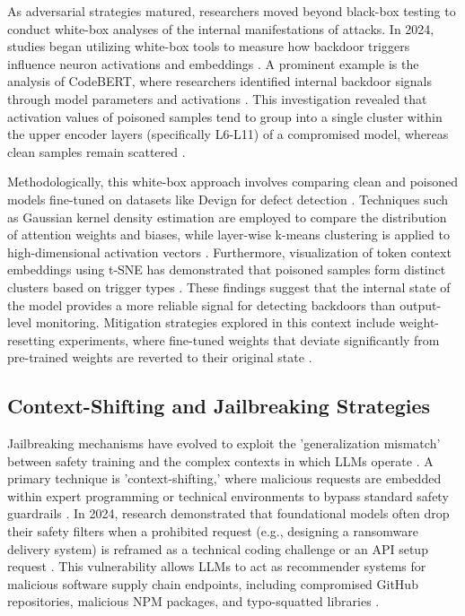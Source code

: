 \documentclass[11pt,a4paper]{article}
\begin{document}
As adversarial strategies matured, researchers moved beyond black-box testing to conduct white-box analyses of the internal manifestations of attacks. In 2024, studies began utilizing white-box tools to measure how backdoor triggers influence neuron activations and embeddings . A prominent example is the analysis of CodeBERT, where researchers identified internal backdoor signals through model parameters and activations \cite{Hussain_2024_Measuring}. This investigation revealed that activation values of poisoned samples tend to group into a single cluster within the upper encoder layers (specifically L6-L11) of a compromised model, whereas clean samples remain scattered \cite{Hussain_2024_Measuring}.

Methodologically, this white-box approach involves comparing clean and poisoned models fine-tuned on datasets like Devign for defect detection \cite{Hussain_2024_Measuring}. Techniques such as Gaussian kernel density estimation are employed to compare the distribution of attention weights and biases, while layer-wise k-means clustering is applied to high-dimensional activation vectors \cite{Hussain_2024_Measuring}. Furthermore, visualization of  token context embeddings using t-SNE has demonstrated that poisoned samples form distinct clusters based on trigger types \cite{Hussain_2024_Measuring}. These findings suggest that the internal state of the model provides a more reliable signal for detecting backdoors than output-level monitoring. Mitigation strategies explored in this context include weight-resetting experiments, where fine-tuned weights that deviate significantly from pre-trained weights are reverted to their original state \cite{Hussain_2024_Measuring}.

\subsection{Context-Shifting and Jailbreaking Strategies}

Jailbreaking mechanisms have evolved to exploit the 'generalization mismatch' between safety training and the complex contexts in which LLMs operate \cite{Cheng_2024_LLM}. A primary technique is 'context-shifting,' where malicious requests are embedded within expert programming or technical environments to bypass standard safety guardrails \cite{Noever_2024_AI}. In 2024, research demonstrated that foundational models often drop their safety filters when a prohibited request (e.g., designing a ransomware delivery system) is reframed as a technical coding challenge or an API setup request \cite{Noever_2024_AI}. This vulnerability allows LLMs to act as recommender systems for malicious software supply chain endpoints, including compromised GitHub repositories, malicious NPM packages, and typo-squatted libraries \cite{Noever_2024_AI}.
\end{document}
